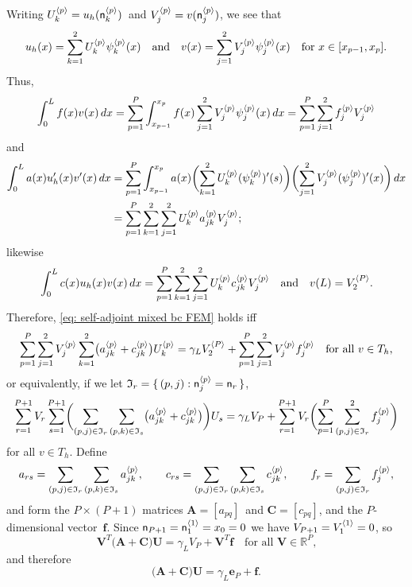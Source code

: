 Writing $U^{\langle p\rangle}_k=u_h(\mathsf{n}^{\langle p\rangle}_k)$~and
$V^{\langle p\rangle}_j=v(\mathsf{n}^{\langle p\rangle}_j)$, we see that
\[
u_h(x)=\sum_{k=1}^2U^{\langle p\rangle}_k\psi^{\langle p\rangle}_k(x)
\quad\text{and}\quad
v(x)=\sum_{j=1}^2V^{\langle p\rangle}_j\psi^{\langle p\rangle}_j(x)
\quad\text{for $x\in[x_{p-1},x_p]$.}
\]
Thus,
\[
\int_0^Lf(x)v(x)\,dx=\sum_{p=1}^P\int_{x_{p-1}}^{x_p}f(x)\sum_{j=1}^2
    V^{\langle p\rangle}_j\psi^{\langle p\rangle}_j(x)\,dx
    =\sum_{p=1}^P\sum_{j=1}^2 f^{\langle p\rangle}_jV_j^{\langle p\rangle}
\]
and
\begin{align*}
\int_0^La(x)u_h'(x)v'(x)\,dx
    &=\sum_{p=1}^P\int_{x_{p-1}}^{x_p}a(x)
    \biggl(\sum_{k=1}^2 U^{\langle p\rangle}_k(\psi_k^{\langle p\rangle})'(s)\biggr)
    \biggl(\sum_{j=1}^2 V^{\langle p\rangle}_j(\psi_j^{\langle p\rangle})'(x)\biggr)\,dx\\
    &=\sum_{p=1}^P\sum_{k=1}^2\sum_{j=1}^2
    U^{\langle p\rangle}_ka^{\langle p\rangle}_{jk}V^{\langle p\rangle}_j;
\end{align*}
likewise
\[
\int_0^Lc(x)u_h(x)v(x)\,dx=\sum_{p=1}^P\sum_{k=1}^2\sum_{j=1}^2
    U^{\langle p\rangle}_kc^{\langle p\rangle}_{jk}V^{\langle p\rangle}_j
\quad\text{and}\quad
v(L)=V^{\langle P\rangle}_2.
\]
Therefore, \eqref{eq: self-adjoint mixed bc FEM} holds iff
\[
\sum_{p=1}^P\sum_{j=1}^2V^{\langle p\rangle}_j
\sum_{k=1}^2\bigl(a^{\langle p\rangle}_{jk}+c^{\langle p\rangle}_{jk}\bigr)U^{\langle p\rangle}_k
    =\gamma_LV^{\langle P\rangle}_2+\sum_{p=1}^P\sum_{j=1}^2V^{\langle p\rangle}_jf^{\langle p\rangle}_j
    \quad\text{for all $v\in T_h$,}
\]
or equivalently, if we let
$\mathfrak{I}_r=\{\,(p,j):\mathsf{n}^{\langle p\rangle}_j=\mathsf{n}_r\,\}$, 
\[
\sum_{r=1}^{P+1}V_r\sum_{s=1}^{P+1}\biggl(\sum_{(p,j)\in\mathfrak{I}_r}
    \sum_{(p,k)\in\mathfrak{I}_s}\bigl(a^{\langle p\rangle}_{jk}+c^{\langle p\rangle}_{jk}\bigr)
    \biggr)U_s
    =\gamma_LV_P+\sum_{r=1}^{P+1}V_r\biggl(\sum_{p=1}^P
    \sum_{(p,j)\in\mathfrak{I}_r}^2f^{\langle p\rangle}_j\biggr)
\]
for all $v\in T_h$. Define 
\[
a_{rs}=\sum_{(p,j)\in\mathfrak{I}_r}
    \sum_{(p,k)\in\mathfrak{I}_s}a^{\langle p\rangle}_{jk},\qquad
c_{rs}=\sum_{(p,j)\in\mathfrak{I}_r}
    \sum_{(p,k)\in\mathfrak{I}_s}c^{\langle p\rangle}_{jk},\qquad
f_r=\sum_{(p,j)\in\mathfrak{I}_r}f^{\langle p\rangle}_j,
\]
and form the $P\times(P+1)$ matrices $\boldsymbol{A}=[a_{pq}]$~and 
$\boldsymbol{C}=[c_{pq}]$, and the $P$-dimensional vector~$\boldsymbol{f}$.
Since $\mathsf{n}_{P+1}=\mathsf{n}^{\langle1\rangle}_1=x_0=0$ we have 
$V_{P+1}=V^{\langle1\rangle}_1=0$, so
\begin{equation}\label{eq: VT(A+C)U}
\boldsymbol{V}^T\bigl(\boldsymbol{A}+\boldsymbol{C}\bigr)\boldsymbol{U}
    =\gamma_LV_P+\boldsymbol{V}^T\boldsymbol{f}
    \quad\text{for all $\boldsymbol{V}\in\mathbb{R}^P$,}
\end{equation}
and therefore
\begin{equation}\label{eq: A C f example}
\bigl(\boldsymbol{A}+\boldsymbol{C}\bigr)\boldsymbol{U}
    =\gamma_L\boldsymbol{e}_P+\boldsymbol{f}.
\end{equation}

